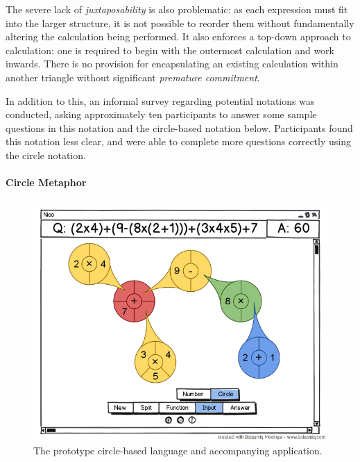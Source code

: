\documentclass[12pt,twoside,notitlepage,xetex]{report}
\begin{document}
{The severe lack of \emph{juxtaposability} is also problematic: as each expression must fit into the larger structure, it is not possible to reorder them without fundamentally altering the calculation being performed.  It also enforces a top-down approach to calculation: one is required to begin with the outermost calculation and work inwards.  There is no provision for encapsulating an existing calculation within another triangle without significant \emph{premature commitment}.

In addition to this, an informal survey regarding potential notations was conducted, asking approximately ten participants to answer some sample questions in this notation and the circle-based notation below.  Participants found this notation less clear, and were able to complete more questions correctly using the circle notation.


\paragraph{Circle Metaphor}\hfill

\begin{figure}[H]
\begin{center}
\includegraphics[width=\textwidth]{figs/mockups/circles/nico_circmock.png}
\caption{The prototype circle-based language and accompanying application.}
\label{fig:ProtoCirc}
\end{center}
\end{figure}

}
\end{document}
